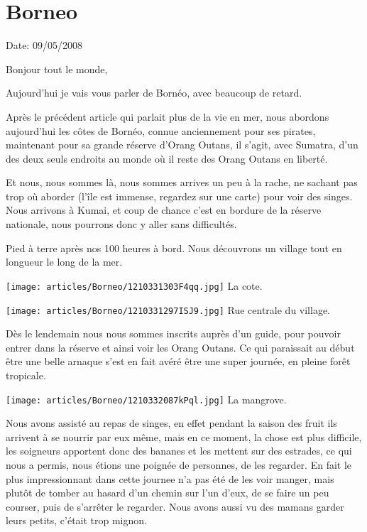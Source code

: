 \section{Borneo}

Date: 09/05/2008

\begin{multicols}{2}

Bonjour tout le monde,

Aujourd'hui je vais vous parler de Bornéo, avec beaucoup de retard.

Après le précédent article qui parlait plus de la vie en mer, nous abordons aujourd'hui les côtes de Bornéo, connue anciennement pour ses pirates, maintenant pour sa grande réserve d'Orang Outans, il s'agit, avec Sumatra, d'un des deux seuls endroits au monde où il reste des Orang Outans en liberté.

Et nous, nous sommes là, nous sommes arrives un peu à la rache, ne sachant pas trop où aborder (l'île est immense, regardez sur une carte) pour voir des singes. Nous arrivons à Kumai, et coup de chance c'est en bordure de la réserve nationale, nous pourrons donc y aller sans difficultés.

Pied à terre après nos 100 heures à bord. Nous découvrons un village tout en longueur le long de la mer.

\hspace*{-0.65cm}
\texttt{[image: articles/Borneo/1210331303F4qq.jpg]}
La cote.

\hspace*{-0.65cm}
\texttt{[image: articles/Borneo/1210331297ISJ9.jpg]}
Rue centrale du village.

Dès le lendemain nous nous sommes inscrits auprès d'un guide, pour pouvoir entrer dans la réserve et ainsi voir les Orang Outans. Ce qui paraissait au début être une belle arnaque s'est en fait avéré être une super journée, en pleine forêt tropicale.

\hspace*{-0.65cm}
\texttt{[image: articles/Borneo/1210332087kPql.jpg]}
La mangrove.

Nous avons assisté au repas de singes, en effet pendant la saison des fruit ils arrivent à se nourrir par eux même, mais en ce moment, la chose est plus difficile, les soigneurs apportent donc des bananes et les mettent sur des estrades, ce qui nous a permis, nous étions une poignée de personnes, de les regarder. En fait le plus impressionnant dans cette journee n'a pas été de les voir manger, mais plutôt de tomber au hasard d'un chemin sur l'un d'eux, de se faire un peu courser, puis de s'arrêter le regarder. Nous avons aussi vu des mamans garder leurs petits, c'était trop mignon.


\end{multicols}
